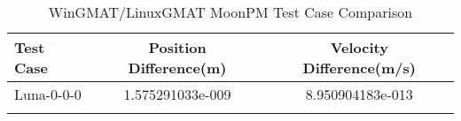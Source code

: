 \begin{table}[htbp!]
\centering
\caption{ WinGMAT/LinuxGMAT MoonPM Test Case Comparison}
      \begin{tabular}{lcc}
      \hline\hline
          Test Case & Position Difference(m) & Velocity Difference(m/s) \\
         \hline
         Luna-0-0-0 & 1.575291033e-009 & 8.950904183e-013 \\
      \hline\hline
      \label{Table: MoonPM WinGMAT-LinuxGMAT Table} 
\end{tabular}
\end{table}
